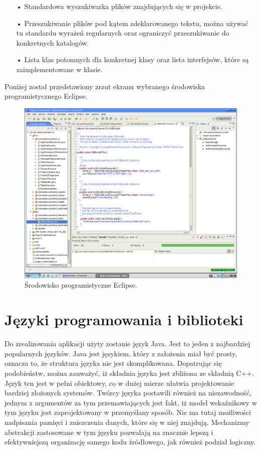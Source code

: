 \begin{itemize}
\item[•]{Standardowa wyszukiwarka plików znajdujących się w projekcie.}
\item[•]{Przeszukiwanie plików pod kątem zdeklarowanego tekstu, można używać tu standardu wyrażeń regularnych oraz ograniczyć przeszukiwanie do konkretnych katalogów.}
\item[•]{Lista klas potomnych dla konkretnej klasy oraz lista interfejsów, które są zaimplementowane w klasie.}
\end{itemize}


Poniżej został przedstawiony zrzut ekranu wybranego środowiska programistycznego Eclipse.


\begin{figure}[h!]
  \centering
  \includegraphics[width=0.5\linewidth]{rys/eclipse1}
  \caption{Środowisko programistyczne Eclipse.}
  \label{fig:schemat}
\end{figure}

\section{{Języki programowania i biblioteki}}

Do zrealizowania aplikacji użyty zostanie język Java. Jest to jeden z najbardziej popularnych języków. 
\cite{horstmann}Java jest językiem, który z założenia miał być prosty, oznacza to, że struktura języka nie jest skomplikowana. Dopatrując się podobieństw, można zauważyć, iż składnia języka jest zbliżona ze składnią C++.  Język ten jest w pełni obiektowy, co w dużej mierze ułatwia projektowanie bardziej złożonych systemów. Twórcy języka postawili również na niezawodność, jednym z argumentów za tym przemawiających jest fakt, iż model wskaźnikowy w tym języku jest zaprojektowany w przemyślany sposób. Nie ma tutaj możliwości nadpisania pamięci i zniszczenia danych, które się w niej znajdują. Mechanizmy abstrakcji zastosowane w tym języku pozwalają na znacznie lepszą i efektywniejszą organizację samego kodu źródłowego, jak również podział logiczny. 


